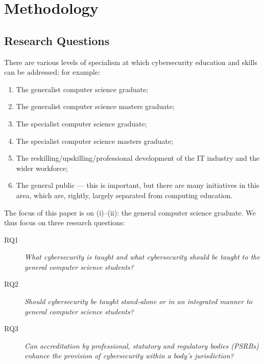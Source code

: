 \documentclass[conference]{IEEEtran}
\begin{document}
\section{Methodology}

\subsection{Research Questions}

There are various levels of specialism at which cybersecurity education and skills can be addressed; for example:
\begin{enumerate}[label=(\roman*)]
\item The generalist computer science graduate;
\item The generalist computer science masters graduate;
\item The specialist computer science graduate;
\item The specialist computer science masters graduate;
\item The reskilling/upskilling/professional development of the IT industry and the wider workforce;
\item The general public --- this is important, but there are many initiatives in this area, which are, rightly, largely separated from computing education.
\end{enumerate}

The focus of this paper is on (i)--(ii): the general computer science graduate. We thus focus on three research questions:

\begin{description}
\item[RQ1] {\emph{What cybersecurity is taught and what cybersecurity should be taught to the general computer science students?}}
\item[RQ2] {\emph{Should cybersecurity be taught stand-alone or in an integrated manner to general computer science students?}}
\item[RQ3] {\emph{Can accreditation by professional, statutory and regulatory bodies (PSRBs) enhance the provision of cybersecurity within a body's jurisdiction?}}
\end{description}
\end{document}
